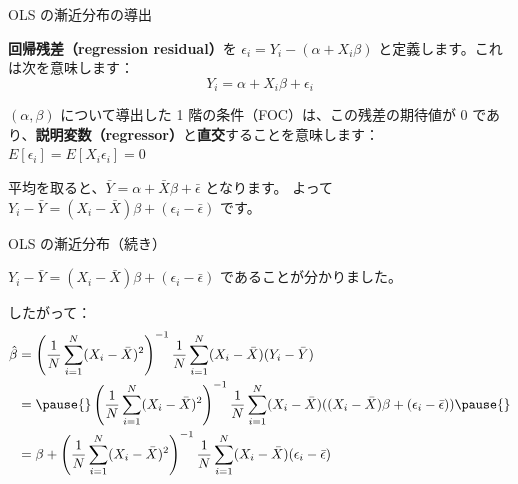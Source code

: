 \documentclass[11pt,handout]{beamer}
\newenvironment{wideitemize}{\itemize\addtolength{\itemsep}{10pt}}{\enditemize}
\begin{document}
\begin{frame}{OLS の漸近分布の導出}
\begin{wideitemize}

\item
\textbf{回帰残差（regression residual）}を $\epsilon_i = Y_i - (\alpha+X_i \beta)$ と定義します。これは次を意味します：
\begin{equation*}
Y_i = \alpha + X_i \beta + \epsilon_i	
\end{equation*}

\pause
\item
$(\alpha,\beta)$ について導出した 1 階の条件（FOC）は、この残差の期待値が 0 であり、\textbf{説明変数（regressor）}と\textbf{直交}することを意味します：$E[\epsilon_i] = E[X_i \epsilon_i] =0$

\pause
\item
平均を取ると、$\bar{Y} = \alpha + \bar{X} \beta + \bar{\epsilon}$ となります。 \pause よって $Y_i - \bar{Y} = (X_i - \bar{X})\beta + (\epsilon_i-\bar\epsilon)$ です。

\end{wideitemize}

\end{frame}

\begin{frame}{OLS の漸近分布（続き）}
	\begin{wideitemize}
		
		\item
		$Y_i - \bar{Y} = (X_i - \bar{X})\beta + (\epsilon_i-\bar\epsilon)$ であることが分かりました。
		
		\item
		したがって：
		\begin{align*}
			\hat\beta &=\left( \frac{1}{N} \sum_{i=1}^N (X_i - \bar{X})^2 \right)^{-1}   \frac{1}{N} \sum_{i=1}^{N} (X_i - \bar{X})(Y_i - \bar{Y})   \\
			&=\pause{} \left( \frac{1}{N} \sum_{i=1}^N (X_i - \bar{X})^2 \right)^{-1}   \frac{1}{N} \sum_{i=1}^{N} (X_i - \bar{X})((X_i - \bar{X})\beta + (\epsilon_i-\bar\epsilon) ) \pause{} \\
			& =\beta + \left( \frac{1}{N} \sum_{i=1}^N (X_i - \bar{X})^2 \right)^{-1}   \frac{1}{N} \sum_{i=1}^{N} (X_i - \bar{X}) (\epsilon_i - \bar\epsilon)
		\end{align*}
\end{wideitemize}	
\end{frame}
\end{document}
